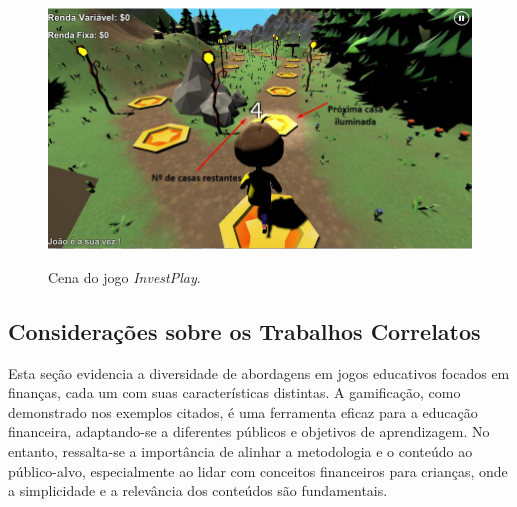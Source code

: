 \begin{figure}[ht]
	\centering
	\caption{Cena do jogo \textit{InvestPlay}.}
	\includegraphics[scale=0.6]{Textuais/Pictures/invest-play-2.png}
	\label{fig:invest-play-2}
\end{figure}

\subsection{Considerações sobre os Trabalhos Correlatos}
Esta seção evidencia a diversidade de abordagens em jogos educativos focados em finanças, cada um com suas características distintas. A gamificação, como demonstrado nos exemplos citados, é uma ferramenta eficaz para a educação financeira, adaptando-se a diferentes públicos e objetivos de aprendizagem. No entanto, ressalta-se a importância de alinhar a metodologia e o conteúdo ao público-alvo, especialmente ao lidar com conceitos financeiros para crianças, onde a simplicidade e a relevância dos conteúdos são fundamentais.


